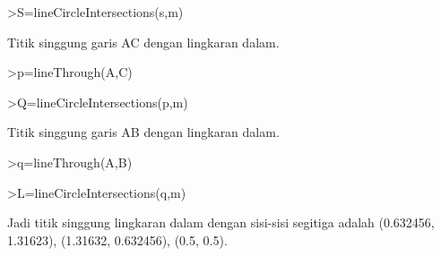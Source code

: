 \documentclass[12pt,Times new roman,letterpaper]{book}
\begin{document}
\begin{eulernootebook}
\begin{eulercomment}
\begin{eulercomment}
\begin{eulernootebook}
\begin{eulercomment}
\begin{eulercomment}
\begin{eulercomment}
\begin{eulercomment}
\begin{eulercomment}
\begin{eulercomment}
\begin{eulernotebook}
\begin{eulercomment}
\begin{eulerprompt}
>S=lineCircleIntersections(s,m)
\end{eulerprompt}
\begin{euleroutput}
  [0.632456,  1.31623]
\end{euleroutput}
\begin{eulercomment}
Titik singgung garis AC dengan lingkaran dalam.
\end{eulercomment}
\begin{eulerprompt}
>p=lineThrough(A,C)
\end{eulerprompt}
\begin{euleroutput}
  [-2,  1,  -2]
\end{euleroutput}
\begin{eulerprompt}
>Q=lineCircleIntersections(p,m)
\end{eulerprompt}
\begin{euleroutput}
  [1.31623,  0.632456]
\end{euleroutput}
\begin{eulercomment}
Titik singgung garis AB dengan lingkaran dalam.
\end{eulercomment}
\begin{eulerprompt}
>q=lineThrough(A,B)
\end{eulerprompt}
\begin{euleroutput}
  [-1,  -1,  -1]
\end{euleroutput}
\begin{eulerprompt}
>L=lineCircleIntersections(q,m)
\end{eulerprompt}
\begin{euleroutput}
  [0.5,  0.5]
\end{euleroutput}
\begin{eulercomment}
Jadi titik singgung lingkaran dalam dengan sisi-sisi segitiga adalah
(0.632456, 1.31623), (1.31632, 0.632456), (0.5, 0.5).


\end{eulercomment}
\end{eulercomment}
\end{eulernotebook}
\end{eulercomment}
\end{eulercomment}
\end{eulercomment}
\end{eulercomment}
\end{eulercomment}
\end{eulercomment}
\end{eulernootebook}
\end{eulercomment}
\end{eulercomment}
\end{eulernootebook}
\end{document}
